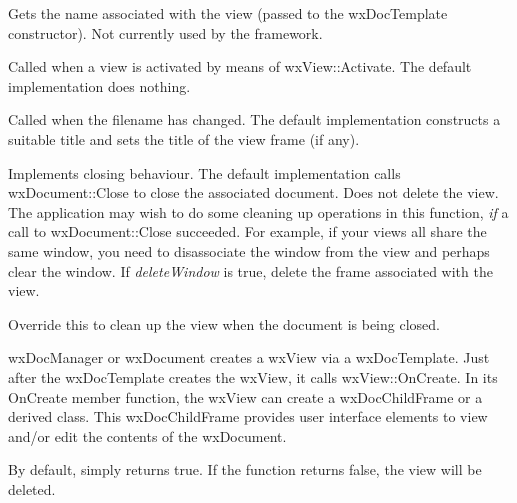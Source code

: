 Gets the name associated with the view (passed to the wxDocTemplate constructor).
Not currently used by the framework.

\label{wxviewonactivateview}


Called when a view is activated by means of wxView::Activate. The default implementation does
nothing.

\label{wxviewonchangefilename}


Called when the filename has changed. The default implementation constructs a
suitable title and sets the title of the view frame (if any).

\label{wxviewonclose}


Implements closing behaviour. The default implementation calls wxDocument::Close
to close the associated document. Does not delete the view. The application
may wish to do some cleaning up operations in this function, {\it if} a
call to wxDocument::Close succeeded. For example, if your views
all share the same window, you need to disassociate the window from the view
and perhaps clear the window. If {\it deleteWindow} is true, delete the
frame associated with the view.

\label{wxviewonclosingdocument}


Override this to clean up the view when the document is being
closed.

\label{wxviewoncreate}


wxDocManager or wxDocument creates a wxView via a wxDocTemplate.
Just after the wxDocTemplate creates the wxView, it calls
wxView::OnCreate. In its OnCreate member function, the wxView can create a wxDocChildFrame
or a derived class. This wxDocChildFrame provides user interface
elements to view and/or edit the contents of the wxDocument.

By default, simply returns true. If the function returns false, the
view will be deleted.

